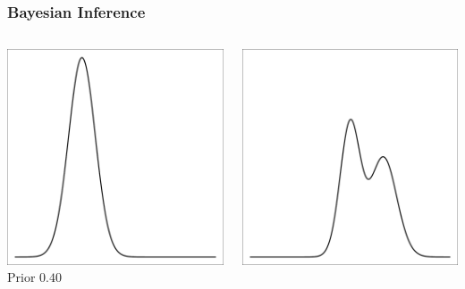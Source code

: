 \documentclass{beamer}
\begin{document}
\begin{frame}[t]
    \frametitle{Bayesian Inference}
    \begin{columns}[c]
            \begin{flushright}
                \includegraphics[width=1\textwidth]{bayesian_update_illustration_th1.pdf}\\
                \vspace{10pt}
                \Large Prior \hfill $0.40$\\
            \end{flushright}
            \begin{flushright}
                \includegraphics[width=1\textwidth]{bayesian_update_illustration_th2.pdf}\\

\end{flushright}
\end{columns}
\end{frame}
\end{document}
